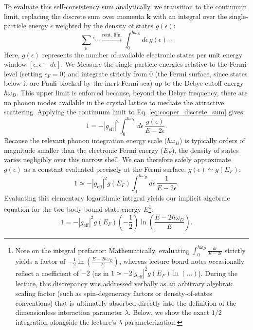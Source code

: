 To evaluate this self-consistency sum analytically, we transition to the continuum limit, replacing the discrete sum over momenta \( \mathbf{k} \) with an integral over the single-particle energy \( \epsilon \) weighted by the density of states \( g(\epsilon) \):
\[
    \sum_{\mathbf{k}}' \cdots \xrightarrow{\text{cont. lim.}} \int_0^{\hbar\omega_D} d\epsilon \, g(\epsilon) \cdots
\]
Here, \( g(\epsilon) \) represents the number of available electronic states per unit energy window \( [\epsilon, \epsilon + d\epsilon] \). We Measure the single-particle energies relative to the Fermi level (setting \( \epsilon_F = 0 \)) and integrate strictly from \( 0 \) (the Fermi surface, since states below it are Pauli-blocked by the inert Fermi sea) up to the Debye cutoff energy \( \hbar\omega_D \). This upper limit is enforced because, beyond the Debye frequency, there are no phonon modes available in the crystal lattice to mediate the attractive scattering. Applying the continuum limit to Eq. \eqref{eq:cooper_discrete_sum} gives:
\[
    1 = -|g_{\text{eff}}|^2 \int_0^{\hbar\omega_D} d\epsilon \, \frac{g(\epsilon)}{E - 2\epsilon}.
\]
Because the relevant phonon integration energy scale (\( \hbar\omega_D \)) is typically orders of magnitude smaller than the electronic Fermi energy (\( E_F \)), the density of states varies negligibly over this narrow shell. We can therefore safely approximate \( g(\epsilon) \) as a constant evaluated precisely at the Fermi surface, \( g(\epsilon) \simeq g(E_F) \):
\[
    1 \simeq -|g_{\text{eff}}|^2 g(E_F) \int_0^{\hbar\omega_D} d\epsilon \, \frac{1}{E - 2\epsilon}.
\]
Evaluating this elementary logarithmic integral yields our implicit algebraic equation for the two-body bound state energy \( E \)\footnote{Note on the integral prefactor: Mathematically, evaluating \( \int_0^{\hbar\omega_D} \frac{d\epsilon}{E - 2\epsilon} \) strictly yields a factor of \( -\frac{1}{2} \ln\left(\frac{E - 2\hbar\omega_D}{E}\right) \), whereas lecture board notes occasionally reflect a coefficient of \( -2 \) (as in \( 1 \simeq -2|g_{\text{eff}}|^2 g(E_F) \ln(\dots) \)). During the lecture, this discrepancy was addressed verbally as an arbitrary algebraic scaling factor (such as spin-degeneracy factors or density-of-states conventions) that is ultimately absorbed directly into the definition of the dimensionless interaction parameter \( \lambda \). Below, we show the exact \( 1/2 \) integration alongside the lecture's \( \lambda \) parameterization.}:
\[
    1 = -|g_{\text{eff}}|^2 g(E_F) \left( -\frac{1}{2} \right) \ln\left( \frac{E - 2\hbar\omega_D}{E} \right).
\]

